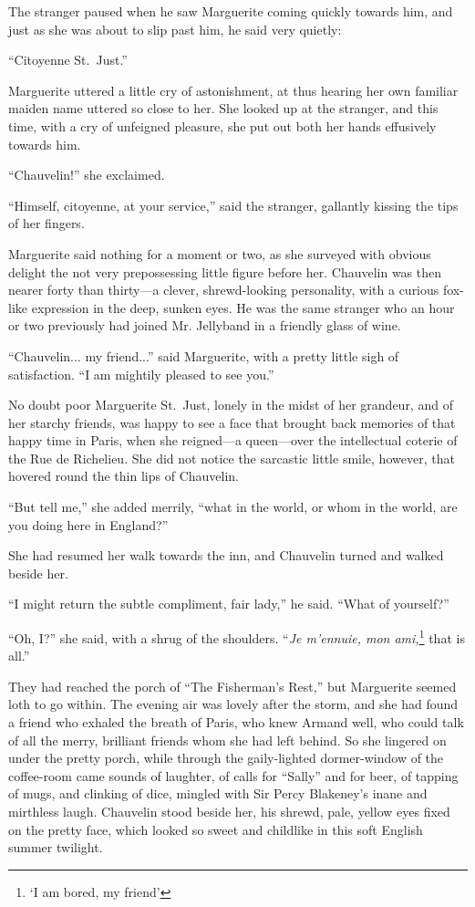 \documentclass[paper=5.5in:8.5in,BCOR=7mm,twoside,DIV=calc,12pt,usegeometry,chapterprefix,endperiod,headings=big]{scrbook}
\begin{document}
The stranger paused when he saw Marguerite coming quickly towards him, and just as she was about to slip past him, he said very quietly:

\enquote{Citoyenne St.~Just.}

Marguerite uttered a little cry of astonishment, at thus hearing her own familiar maiden name uttered so close to her. She looked up at the stranger, and this time, with a cry of unfeigned pleasure, she put out both her hands effusively towards him.

\enquote{Chauvelin!} she exclaimed.

\enquote{Himself, citoyenne, at your service,} said the stranger, gallantly kissing the tips of her fingers.

Marguerite said nothing for a moment or two, as she surveyed with obvious delight the not very prepossessing little figure before her. Chauvelin was then nearer forty than thirty---a clever, shrewd-looking personality, with a curious fox-like expression in the deep, sunken eyes. He was the same stranger who an hour or two previously had joined Mr. Jellyband in a friendly glass of wine.

\enquote{Chauvelin... my friend...} said Marguerite, with a pretty little sigh of satisfaction. \enquote{I am mightily pleased to see you.}

No doubt poor Marguerite St.~Just, lonely in the midst of her grandeur, and of her starchy friends, was happy to see a face that brought back memories of that happy time in Paris, when she reigned---a queen---over the intellectual coterie of the Rue de Richelieu. She did not notice the sarcastic little smile, however, that hovered round the thin lips of Chauvelin.

\enquote{But tell me,} she added merrily, \enquote{what in the world, or whom in the world, are you doing here in England?}

She had resumed her walk towards the inn, and Chauvelin turned and walked beside her.

\enquote{I might return the subtle compliment, fair lady,} he said. \enquote{What of yourself?}

\enquote{Oh, I?} she said, with a shrug of the shoulders. \enquote{\textit{Je m'ennuie, mon ami,}\footnote{\enquote{I am bored, my friend}} that is all.}

They had reached the porch of \enquote{The Fisherman's Rest,} but Marguerite seemed loth to go within. The evening air was lovely after the storm, and she had found a friend who exhaled the breath of Paris, who knew Armand well, who could talk of all the merry, brilliant friends whom she had left behind. So she lingered on under the pretty porch, while through the gaily-lighted dormer-window of the coffee-room came sounds of laughter, of calls for \enquote{Sally} and for beer, of tapping of mugs, and clinking of dice, mingled with Sir Percy Blakeney's inane and mirthless laugh. Chauvelin stood beside her, his shrewd, pale, yellow eyes fixed on the pretty face, which looked so sweet and childlike in this soft English summer twilight.
\end{document}
